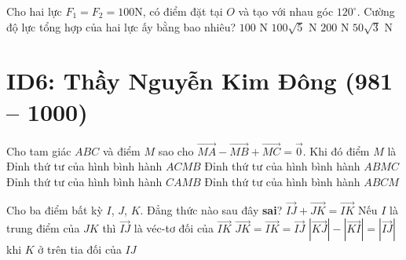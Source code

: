 \begin{ex}%
	Cho hai lực $F_1=F_2=100$N, có điểm đặt tại $O$ và tạo với nhau góc $120^\circ$. Cường độ lực tổng hợp của hai lực ấy bằng bao nhiêu?
	\choice
	{
		\True $100$ N}
	{
		$100\sqrt{5}$ N}
	{
		$200$ N}
	{$50\sqrt{3}$ N}
\end{ex}




\section*{ID6: Thầy Nguyễn Kim Đông (981 -- 1000)}
\begin{ex}%
	Cho tam giác $ABC$ và điểm $M$ sao cho $\vec{MA} - \vec{MB} + \vec{MC}  = \vec{0}$. Khi đó điểm $M$ là
	\choice
	{	Đỉnh thứ tư của hình bình hành $ACMB$}
	{	Đỉnh thứ tư của hình bình hành $ABMC$}
	{	Đỉnh thứ tư của hình bình hành $CAMB$}
	{	\True Đỉnh thứ tư của hình bình hành $ABCM$}
\end{ex}

\begin{ex}%
	Cho ba điểm bất kỳ $I$, $J$, $K$. Đẳng thức nào sau đây \textbf{sai}?
	\choice
	{	$\vec{IJ}+\vec{JK}=\vec{IK}$}
	{	Nếu $I$ là trung điểm của $JK$ thì $\vec{IJ}$ là véc-tơ đối của $\vec{IK}$}
	{	\True  $\vec{JK} = \vec{IK}=\vec{IJ}$}
	{	$\left| \vec{KJ}\right| - \left| \vec{KI}\right| = \left| \vec{IJ}\right|$ khi $K$ ở trên tia đối của $IJ$}
\end{ex}

